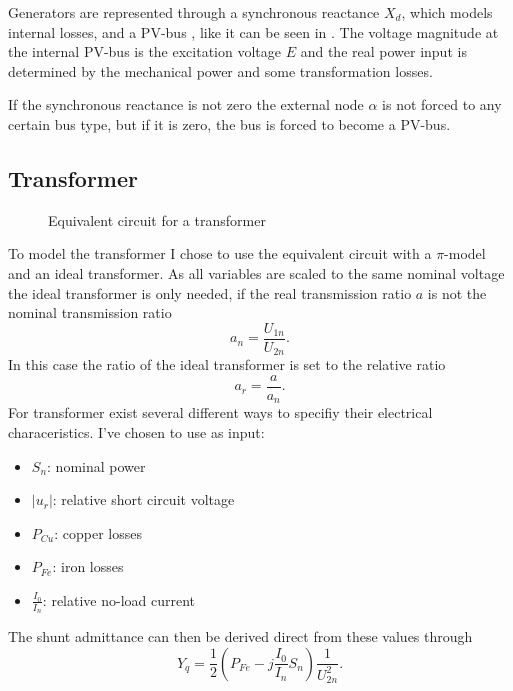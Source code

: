 Generators are represented through a synchronous reactance $X_d$, which models internal losses, and a PV-bus \citep[p. 55]{powerSystemAnalysis}, like it can be seen in . The voltage magnitude at the internal PV-bus is the excitation voltage $E$ and the real power input is determined by the mechanical power and some transformation losses. 

If the synchronous reactance is not zero the external node $\alpha$ is not forced to any certain bus type, but if it is zero, the bus is forced to become a PV-bus.

\subsection{Transformer}

\begin{figure}
	\centering
	
	\caption{Equivalent circuit for a transformer}
	\label{fig:transformer}
\end{figure}

To model the transformer I chose to use the equivalent circuit  with a $\pi$-model and an ideal transformer. As all variables are scaled to the same nominal voltage the ideal transformer is only needed, if the real transmission ratio $a$ is not the nominal transmission ratio
\begin{equation}
	a_n = \frac{U_{1n}}{U_{2n}}.
\end{equation}
In this case the ratio of the ideal transformer is set to the relative ratio
\begin{equation}
	a_r = \frac{a}{a_n}.
\end{equation}
For transformer exist several different ways to specifiy their electrical characeristics. I've chosen to use as input:
\begin{itemize}
	\item $S_n$: nominal power
	\item $|u_r|$: relative short circuit voltage
	\item $P_{Cu}$: copper losses
	\item $P_{Fe}$: iron losses
	\item $\frac{I_0}{I_n}$: relative no-load current
\end{itemize}

The shunt admittance can then be derived direct from these values through
\begin{equation}
	Y_q = \frac{1}{2} \left( P_{Fe} - j \frac{I_0}{I_n} S_n \right) \frac{1}{U_{2n}^2}.
\end{equation}

